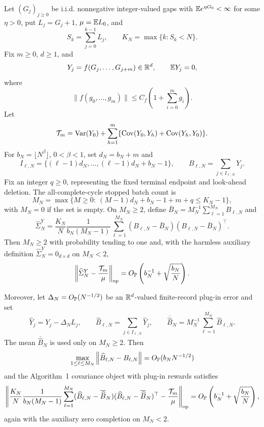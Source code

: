 \begin{proposition}\label{prop:calendar-stopped-separated-batch-plugin-main}
Let \((G_j)_{j\ge0}\) be i.i.d. nonnegative integer-valued gaps with
\(\mathbb E e^{\eta G_0}<\infty\) for some \(\eta>0\), put
\(L_j=G_j+1\), \(\mu=\mathbb E L_0\), and
\[
S_k=\sum_{j=0}^{k-1}L_j,\qquad
K_N=\max\{k:S_k<N\}.
\]
Fix \(m\ge0\), \(d\ge1\), and
\[
Y_j=f(G_j,\ldots,G_{j+m})\in\mathbb R^d,\qquad
\mathbb E Y_j=0,
\]
where
\[
\|f(g_0,\ldots,g_m)\|\le C_f\left(1+\sum_{i=0}^m g_i\right).
\]
Let
\[
\mathcal T_m=\mathrm{Var}(Y_0)+
\sum_{h=1}^{m}\{\operatorname{Cov}(Y_0,Y_h)+\operatorname{Cov}(Y_h,Y_0)\}.
\]
For \(b_N=\lfloor N^\beta\rfloor\), \(0<\beta<1\), set
\(d_N=b_N+m\) and
\[
I_{\ell,N}=\{(\ell-1)d_N,\ldots,(\ell-1)d_N+b_N-1\},
\qquad
B_{\ell,N}=\sum_{j\in I_{\ell,N}}Y_j .
\]
Fix an integer \(q\ge0\), representing the fixed terminal endpoint and
look-ahead deletion.  The all-complete-cycle stopped batch count is
\[
M_N=\max\{M\ge0:\ (M-1)d_N+b_N-1+m+q\le K_N-1\},
\]
with \(M_N=0\) if the set is empty.  On \(M_N\ge2\), define
\(\bar B_N=M_N^{-1}\sum_{\ell=1}^{M_N}B_{\ell,N}\) and
\[
\widehat\Sigma_N^{Y}
=
\frac{K_N}{N}\frac1{b_N(M_N-1)}
\sum_{\ell=1}^{M_N}(B_{\ell,N}-\bar B_N)
(B_{\ell,N}-\bar B_N)^\top .
\]
Then \(M_N\ge2\) with probability tending to one and, with the harmless
auxiliary definition \(\widehat\Sigma_N^{Y}=0_{d\times d}\) on \(M_N<2\),
\begin{equation}\label{eq:calendar-stopped-separated-batch-rate-main}
\left\|\widehat\Sigma_N^{Y}-\frac{\mathcal T_m}{\mu}
\right\|_{\operatorname{op}}
=O_{\mathbb P}\left(b_N^{-1}+\sqrt{\frac{b_N}{N}}\right).
\end{equation}

Moreover, let \(\Delta_N=O_{\mathbb P}(N^{-1/2})\) be an \(\mathbb R^d\)-valued
finite-record plug-in error and set
\[
\widehat Y_j=Y_j-\Delta_N L_j,\qquad
\widehat B_{\ell,N}=\sum_{j\in I_{\ell,N}}\widehat Y_j,\qquad
\overline{\widehat B}_N=M_N^{-1}\sum_{\ell=1}^{M_N}\widehat B_{\ell,N}.
\]
The mean \(\overline{\widehat B}_N\) is used only on \(M_N\ge2\).
Then
\begin{equation}\label{eq:calendar-stopped-plugin-block-main}
\max_{1\le\ell\le M_N}
\left\|\widehat B_{\ell,N}-B_{\ell,N}\right\|
=O_{\mathbb P}(b_NN^{-1/2})
\end{equation}
and the Algorithm~1 covariance object with plug-in rewards satisfies
\begin{equation}\label{eq:calendar-stopped-plugin-covariance-rate-main}
\left\|
\frac{K_N}{N}\frac1{b_N(M_N-1)}
\sum_{\ell=1}^{M_N}
(\widehat B_{\ell,N}-\overline{\widehat B}_N)
(\widehat B_{\ell,N}-\overline{\widehat B}_N)^\top
-\frac{\mathcal T_m}{\mu}
\right\|_{\operatorname{op}}
=O_{\mathbb P}\left(b_N^{-1}+\sqrt{\frac{b_N}{N}}\right),
\end{equation}
again with the auxiliary zero completion on \(M_N<2\).
\end{proposition}

